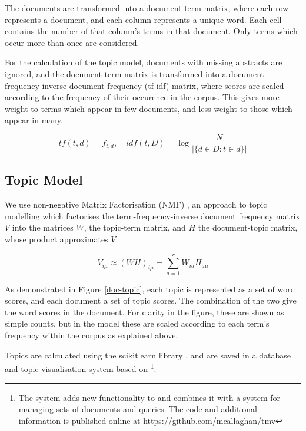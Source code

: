 \documentclass{article}
\begin{document}
\begin{linenumbers}
	The documents are transformed into a document-term matrix, where each row represents a document, and each column represents a unique word.  Each cell contains the number of that column's terms in that document. Only terms which occur more than once are considered.
	
	For the calculation of the topic model, documents with missing abstracts are ignored, and the document term matrix is transformed into a document
	frequency-inverse document frequency (tf-idf) matrix, where scores are scaled according to the frequency of their occurence in the corpus. This gives more weight to terms which appear in few documents, and less weight to those which appear in many.
	
	\begin{equation}
	tf(t,d) = f_{t,d} \mathrm{,}\quad idf(t,D) = \log\frac{N}{|\{d \in D:t \in d\}|}
	\end{equation} 
	
	\subsection*{Topic Model}
	
	We use non-negative Matrix Factorisation (NMF) \cite{Lee1999}, an approach to topic modelling which factorises the term-frequency-inverse document frequency matrix \( V \) into the matrices \(W\), the topic-term matrix, and \( H \) the document-topic matrix, whose product approximates \(V\):
	
	\begin{equation}
		V_{i\mu} \approx (WH)_{i\mu} = \sum_{a=1}^{r}W_{ia}H_{a\mu}
	\end{equation}
	
	As demonstrated in Figure \ref{doc-topic}, each topic is represented as a set of word scores, and each document a set of topic scores. The combination of the two give the word scores in the document. For clarity in the figure, these are shown as simple counts, but in the model these are scaled according to each term's frequency within the corpus as explained above.
	
	Topics are calculated using the scikitlearn library \cite{Pedregosa2011}, and are saved in a database and topic visualisation system based on \cite{Chaney2012} \footnote{The system adds new functionality to \cite{Chaney2012} and combines it with a system for managing sets of documents and queries. The code and additional information is published online at \url{https://github.com/mcallaghan/tmv}}. 	
	

\end{linenumbers}
\end{document}
